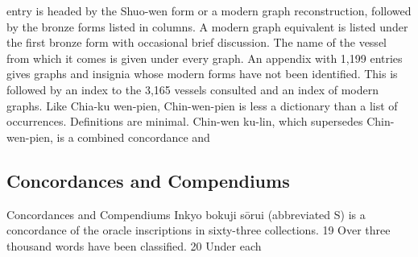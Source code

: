 entry is headed by the Shuo-wen form or a modern graph reconstruction, followed by the
bronze forms listed in columns. A modern graph equivalent is listed under the first bronze
form with occasional brief discussion. The name of the vessel from which it comes is given
under every graph. An appendix with 1,199 entries gives graphs and insignia whose
modern forms have not been identified. This is followed by an index to the 3,165 vessels
consulted and an index of modern graphs. Like Chia-ku wen-pien, Chin-wen-pien is less a
dictionary than a list of occurrences. Definitions are minimal.
Chin-wen ku-lin, which supersedes Chin-wen-pien, is a combined concordance and

\subsection[Concordances and Compendiums]{Concordances and Compendiums}
\label{sec:chapters-ch03:3.3.2}

Concordances and Compendiums
Inkyo bokuji sōrui (abbreviated S) is a concordance of the oracle inscriptions in
sixty-three collections. 19 Over three thousand words have been classified. 20 Under each

